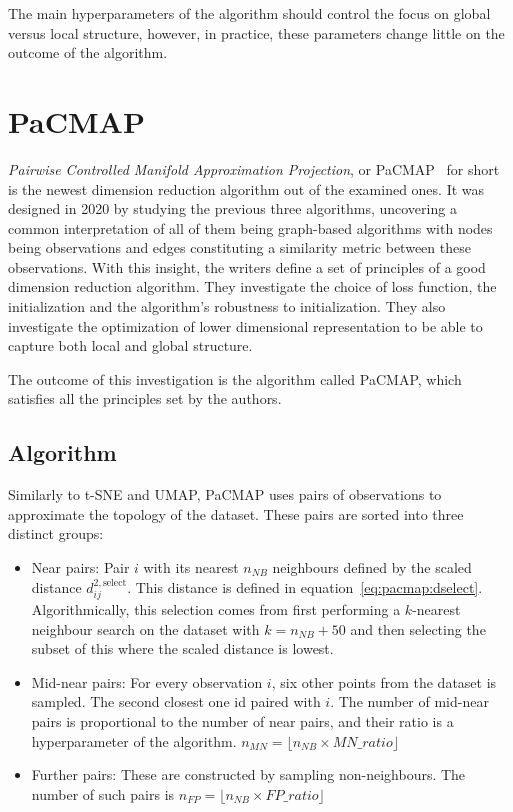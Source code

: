 The main hyperparameters of the algorithm should control the focus on global versus local structure, however, in practice, these parameters change little on the outcome of the algorithm.

\section{PaCMAP}\label{sec:pacmap}

\textit{Pairwise Controlled Manifold Approximation Projection}, or PaCMAP~\cite{bib:pacmap} for short is the newest dimension reduction algorithm out of the examined ones. It was designed in 2020 by studying the previous three algorithms, uncovering a common interpretation of all of them being graph-based algorithms with nodes being observations and edges constituting a similarity metric between these observations. With this insight, the writers define a set of principles of a good dimension reduction algorithm. They investigate the choice of loss function, the initialization and the algorithm's robustness to initialization. They also investigate the optimization of lower dimensional representation to be able to capture both local and global structure.

The outcome of this investigation is the algorithm called PaCMAP, which satisfies all the principles set by the authors.

\subsection{Algorithm}

Similarly to t-SNE and UMAP, PaCMAP uses pairs of observations to approximate the topology of the dataset. These pairs are sorted into three distinct groups:

\begin{itemize}
	\item Near pairs: Pair $i$ with its nearest $n_{NB}$ neighbours defined by the scaled distance $d^{2,\textrm{select}}_{ij}$. This distance is defined in equation~\eqref{eq:pacmap:dselect}. Algorithmically, this selection comes from first performing a $k$-nearest neighbour search on the dataset with $k = n_{NB} + 50$ and then selecting the subset of this where the scaled distance is lowest.
	\item Mid-near pairs: For every observation $i$, six other points from the dataset is sampled. The second closest one id paired with $i$. The number of mid-near pairs is proportional to the number of near pairs, and their ratio is a hyperparameter of the algorithm. $n_{MN} = \lfloor n_{NB} \times MN\_ratio\rfloor$
	\item Further pairs: These are constructed by sampling non-neighbours. The number of such pairs is $n_{FP} = \lfloor n_{NB} \times FP\_ratio \rfloor$
\end{itemize}

